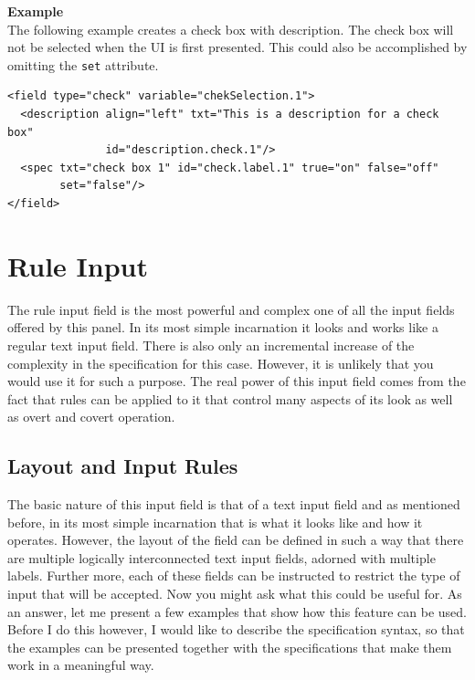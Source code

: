 \textbf{Example}\\

The following example creates a check box with description. The check
box will not be selected when the UI is first presented. This could also
be accomplished by omitting the \texttt{set} attribute.\\

\footnotesize
\begin{verbatim}
<field type="check" variable="chekSelection.1">
  <description align="left" txt="This is a description for a check box"
               id="description.check.1"/>
  <spec txt="check box 1" id="check.label.1" true="on" false="off" 
        set="false"/>
</field>
\end{verbatim}
\normalsize

\section{Rule Input}

The rule input field is the most powerful and complex one of all the
input fields offered by this panel. In its most simple incarnation it
looks and works like a regular text input field. There is also only an
incremental increase of the complexity in the specification for this
case. However, it is unlikely that you would use it for such a purpose.
The real power of this input field comes from the fact that rules can be
applied to it that control many aspects of its look as well as overt and
covert operation.\\

\subsection{Layout and Input Rules}

The basic nature of this input field is that of a text input field and
as mentioned before, in its most simple incarnation that is what it
looks like and how it operates. However, the layout of the field can be
defined in such a way that there are multiple logically interconnected
text input fields, adorned with multiple labels. Further more, each of
these fields can be instructed to restrict the type of input that will
be accepted. Now you might ask what this could be useful for. As an
answer, let me present a few examples that show how this feature can be
used. Before I do this however, I would like to describe the
specification syntax, so that the examples can be presented together
with the specifications that make them work in a meaningful way.\\

